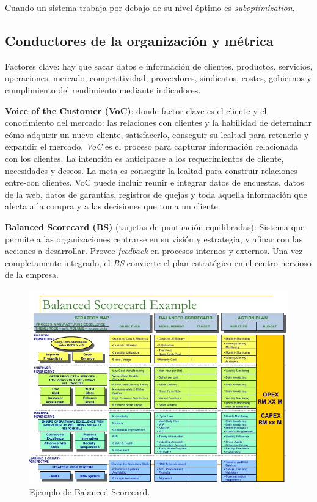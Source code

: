 \documentclass[]{article}
\begin{document}
Cuando un sistema trabaja por debajo de su nivel óptimo es \textit{suboptimization}.

\subsection{Conductores de la organización y métrica}
Factores clave: hay que sacar datos e información de clientes, productos, servicios, operaciones, mercado, competitividad, proveedores, sindicatos, costes, gobiernos y cumplimiento del rendimiento mediante indicadores.

\textbf{Voice of the Customer (VoC)}: donde factor clave es el cliente y el conocimiento del mercado: las relaciones con clientes y la habilidad de determinar cómo adquirir un nuevo cliente, satisfacerlo, conseguir su lealtad para retenerlo y expandir el mercado. \textit{VoC} es el proceso para capturar información relacionada con los clientes. La intención es anticiparse a los requerimientos de cliente, necesidades y deseos. La meta es conseguir la lealtad para construir relaciones entre-con clientes. VoC puede incluir reunir e integrar datos de encuestas, datos de la web, datos de garantías, registros de quejas y toda aquella información que afecta a la compra y a las decisiones que toma un cliente.

\textbf{Balanced Scorecard (BS)} (tarjetas de puntuación equilibradas): Sistema que permite a las organizaciones centrarse en su visión y estrategia, y afinar con las acciones a desarrollar. Provee \textit{feedback} en procesos internos y externos. Una vez completamente integrado, el \textit{BS} convierte el plan estratégico en el centro nervioso de la empresa.

\begin{figure}[ht!]
	\centering
	\includegraphics[width=140mm]{imagenes/BS.jpg}
	\caption{Ejemplo de Balanced Scorecard.}
	\label{fig:Balanced ScoreCard}
\end{figure}
\end{document}
